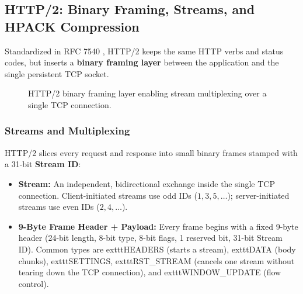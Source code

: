 \subsection{HTTP/2: Binary Framing, Streams, and HPACK Compression}

Standardized in RFC 7540 \cite{rfc7540}, HTTP/2 keeps the same HTTP verbs and status codes, but inserts a \textbf{binary framing layer} between the application and the single persistent TCP socket.

\begin{figure}[htbp]
\centering
{}
\caption{HTTP/2 binary framing layer enabling stream multiplexing over a single TCP connection.}
\label{fig:v1-ch01-http2-framing}
\end{figure}

\subsubsection{Streams and Multiplexing}
HTTP/2 slices every request and response into small binary frames stamped with a 31-bit \textbf{Stream ID}:
\begin{itemize}[leftmargin=15pt]
  \item \textbf{Stream:} An independent, bidirectional exchange inside the single TCP connection. Client-initiated streams use odd IDs ($1, 3, 5, \dots$); server-initiated streams use even IDs ($2, 4, \dots$).
  \item \textbf{9-Byte Frame Header + Payload:} Every frame begins with a fixed 9-byte header (24-bit length, 8-bit type, 8-bit flags, 1 reserved bit, 31-bit Stream ID). Common types are 	exttt{HEADERS} (starts a stream), 	exttt{DATA} (body chunks), 	exttt{SETTINGS}, 	exttt{RST\_STREAM} (cancels one stream without tearing down the TCP connection), and 	exttt{WINDOW\_UPDATE} (flow control).
\end{itemize}


